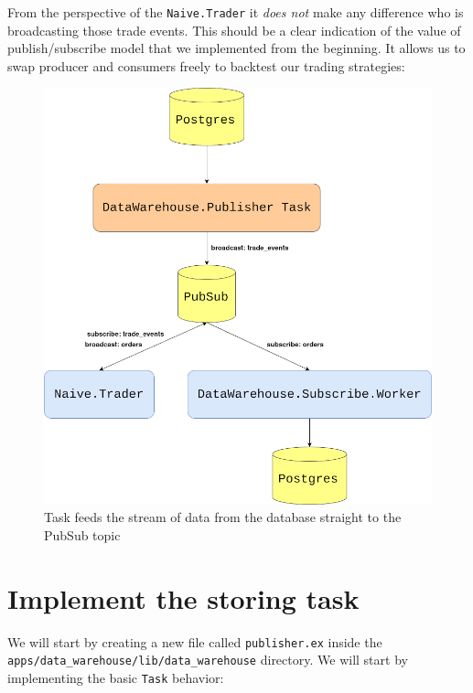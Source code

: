 \documentclass[
  oneside]{book}
\begin{document}
From the perspective of the \texttt{Naive.Trader} it \emph{does not} make any difference who is broadcasting those trade events. This should be a clear indication of the value of publish/subscribe model that we implemented from the beginning. It allows us to swap producer and consumers freely to backtest our trading strategies:

\begin{figure}
\centering
\includegraphics{images/chapter_14_03_backtest_pubsub.png}
\caption{Task feeds the stream of data from the database straight to the PubSub topic}
\end{figure}

\hypertarget{implement-the-storing-task}{%
\section{Implement the storing task}\label{implement-the-storing-task}}

We will start by creating a new file called \texttt{publisher.ex} inside the \texttt{apps/data\_warehouse/lib/data\_warehouse} directory. We will start by implementing the basic \texttt{Task} behavior:
\end{document}
